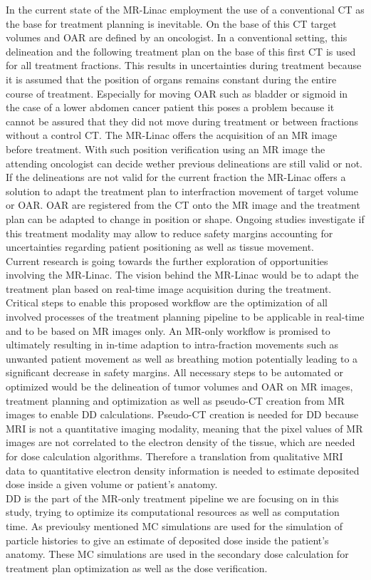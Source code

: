 In the current state of the MR-Linac employment the use of a conventional \ac{CT} as the base for treatment planning is inevitable.
On the base of this \acs{CT} target volumes and \ac{OAR} are defined by an oncologist.
In a conventional setting, this delineation and the following treatment plan on the base of this first \ac{CT} is used for all treatment fractions.
This results in uncertainties during treatment because it is assumed that the position of organs remains constant during the entire course of treatment.
Especially for moving \acs{OAR} such as bladder or sigmoid in the case of a lower abdomen cancer patient this poses a problem because it cannot be assured that they did not move during treatment or between fractions without a control \acs{CT}.
The MR-Linac offers the acquisition of an MR image before treatment.
With such position verification using an MR image the attending oncologist can decide wether previous delineations are still valid or not. If the delineations are not valid for the current fraction the MR-Linac offers a solution to adapt the treatment plan to interfraction movement of target volume or \acs{OAR}.
\acs{OAR} are registered from the CT onto the MR image and the treatment plan can be adapted to change in position or shape.
Ongoing studies investigate if this treatment modality may allow to reduce safety margins accounting for uncertainties regarding patient positioning as well as tissue movement.\\
Current research is going towards the further exploration of opportunities involving the MR-Linac.
The vision behind the MR-Linac would be to adapt the treatment plan based on real-time image acquisition during the treatment.
Critical steps to enable this proposed workflow are the optimization of all involved processes of the treatment planning pipeline to be applicable in real-time and to be based on MR images only.
An MR-only workflow is promised to ultimately resulting in in-time adaption to intra-fraction movements such as unwanted patient movement as well as breathing motion potentially leading to a significant decrease in safety margins.
All necessary steps to be automated or optimized would be the delineation of tumor volumes and \acs{OAR} on MR images, treatment planning and optimization as well as pseudo-CT creation from MR images to enable \acs{DD} calculations.
Pseudo-CT creation is needed for \acs{DD} because \acs{MRI} is not a quantitative imaging modality, meaning that the pixel values of MR images are not correlated to the electron density of the tissue, which are needed for dose calculation algorithms.
Therefore a translation from qualitative MRI data to quantitative electron density information is needed to estimate deposited dose inside a given volume or patient's anatomy.\\
\acs{DD} is the part of the MR-only treatment pipeline we are focusing on in this study, trying to optimize its computational resources as well as computation time. 
As previoulsy mentioned \acs{MC} simulations are used for the simulation of particle histories to give an estimate of deposited dose inside the patient's anatomy.
These \acs{MC} simulations are used in the secondary dose calculation for treatment plan optimization as well as the dose verification.

